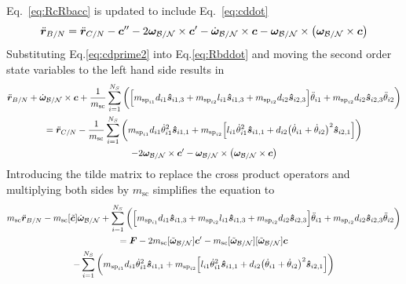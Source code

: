 \documentclass[paper]{aiaaNew}
\begin{document}
	Eq.~\eqref{eq:RcRbacc} is updated to include Eq.~\eqref{eq:cddot}
	\begin{equation}
	\ddot{\bm r}_{B/N} = \ddot{\bm r}_{C/N}-\bm{c}'' - 2\bm\omega_{\cal B/N}\times\bm{c}'-\dot{\bm\omega}_{\cal B/N}\times\bm{c}-\bm\omega_{\cal B/N}\times\left(\bm\omega_{\cal B/N}\times\bm{c}\right)
	\label{eq:Rbddot}
	\end{equation}
	Substituting Eq.\eqref{eq:cdprime2} into Eq.\eqref{eq:Rbddot} and moving the second order state variables to the left hand side results in
	\begin{multline}
	\ddot{\bm r}_{B/N} + \dot{\bm\omega}_{\cal B/N}\times\bm{c} +  \frac{1}{m_{\text{sc}}}\sum_{i=1}^{N_{S}}\bigg(\Big[m_{\text{sp}_{i1}}d_{i1} \bm{\hat{s}}_{i1,3} +m_{\text{sp}_{i2}}l_{i1} \bm{\hat{s}}_{i1,3}+m_{\text{sp}_{i2}} d_{i2}\bm{\hat{s}}_{i2,3}\Big]\ddot{\theta}_{i1} +m_{\text{sp}_{i2}} d_{i2} \bm{\hat{s}}_{i2,3}\ddot{\theta}_{i2}\bigg) \\
	= \ddot{\bm r}_{C/N}-\frac{1}{m_{\text{sc}}}\sum_{i=1}^{N_{S}}\bigg(m_{\text{sp}_{i1}}d_{i1} \dot{\theta}_{i1}^2 \bm{\hat{s}}_{i1,1} +m_{\text{sp}_{i2}}\Big[l_{i1} \dot{\theta}_{i1}^2 \bm{\hat{s}}_{i1,1} + d_{i2}\big(\dot{\theta}_{i1} + \dot{\theta}_{i2}\big)^2\bm{\hat{s}}_{i2,1}\Big]\bigg) \\
	- 2\bm\omega_{\cal B/N}\times\bm{c}'-\bm\omega_{\cal B/N}\times\left(\bm\omega_{\cal B/N}\times\bm{c}\right)
	\label{eq:Rbddot2}
	\end{multline}
	Introducing the tilde matrix\cite{schaub} to replace the cross product operators and multiplying both sides by $m_\text{sc}$ simplifies the equation to
		\begin{multline}
	m_\text{sc} \ddot{\bm r}_{B/N} -m_\text{sc} [\tilde{\bm{c}}] \dot{\bm\omega}_{\cal B/N} +  \sum_{i=1}^{N_{S}}\bigg(\Big[m_{\text{sp}_{i1}}d_{i1} \bm{\hat{s}}_{i1,3} +m_{\text{sp}_{i2}}l_{i1} \bm{\hat{s}}_{i1,3}+m_{\text{sp}_{i2}} d_{i2}\bm{\hat{s}}_{i2,3}\Big]\ddot{\theta}_{i1} +m_{\text{sp}_{i2}} d_{i2} \bm{\hat{s}}_{i2,3}\ddot{\theta}_{i2}\bigg) \\
	= \bm F - 2m_\text{sc} [\tilde{\bm\omega}_{\cal B/N}] \bm c'- m_\text{sc} [\tilde{\bm\omega}_{\cal B/N}][\tilde{\bm\omega}_{\cal B/N}]\bm{c}\\
	-\sum_{i=1}^{N_{S}}\bigg(m_{\text{sp}_{i1}}d_{i1} \dot{\theta}_{i1}^2 \bm{\hat{s}}_{i1,1} +m_{\text{sp}_{i2}}\Big[l_{i1} \dot{\theta}_{i1}^2 \bm{\hat{s}}_{i1,1} + d_{i2}\big(\dot{\theta}_{i1} + \dot{\theta}_{i2}\big)^2\bm{\hat{s}}_{i2,1}\Big]\bigg) 
	\label{eq:Rbddot3}
	\end{multline}
	
\end{document}
